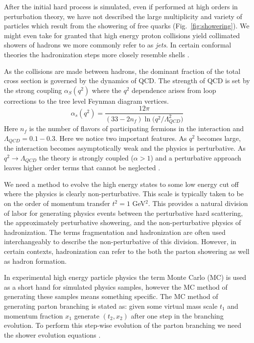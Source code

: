 After the initial hard process is simulated, even if performed at high orders in perturbation theory, we have not
described the large multiplicity and variety of particles which result from the showering of free quarks (Fig.~\ref{fig:showering}). 
We might even take for granted that high energy proton collisions yield collimated showers of hadrons
 we more commonly refer to as \textit{jets}. In certain conformal theories the hadronization steps more 
closely resemble shells \cite{juan}.

As the collisions are made between hadrons, the dominant fraction
of the total cross section is governed by the dynamics of QCD. The strength of QCD is set by the strong coupling $\alpha_S(q^2)$ where the $q^2$ dependence arises from loop corrections to the tree level Feynman diagram vertices. \cite{tully}
\begin{equation} \label{eq:running_qcd}
\alpha_s(q^2) = \frac{12\pi}{(33-2n_f)\ln{(q^2 /\Lambda_{QCD}^2})}
\end{equation}
Here $n_f$ is the number of flavors of participating fermions in the interaction and $\Lambda_{QCD}=0.1-0.3$. Here we notice two important features. As $q^2$ becomes large, the interaction becomes asymptotically weak and the physics is perturbative. As $q^2\rightarrow \Lambda_{QCD}$ the theory is
strongly coupled ($\alpha > 1$) and a perturbative approach leaves higher order terms that cannot be neglected 
\cite{qcdcollider}.

We need a method to evolve the high energy states to some low energy cut off where the physics is clearly non-perturbative. 
This scale is typically taken to be on the order of momentum transfer $t^2 = 1$ GeV$^2$.
This provides a natural division of labor for generating physics events between the perturbative hard scattering, the approximately perturbative showering, and the non-perturbative physics of hadronization. The terms fragmentation and hadronization are often used interchangeably to describe the non-perturbative of this division. However, in certain contexts, hadronization can refer to the both the parton showering as well as hadron formation. 

In experimental high energy particle physics the term Monte Carlo (MC) is used as a short hand for simulated 
physics samples, however the MC method of generating
these samples means something specific. The MC method of generating parton branching is stated as: given some 
virtual mass scale $t_1$ and momentum fraction $x_1$ generate
 $(t_2, x_2)$ after one step in the branching evolution. To perform this step-wise evolution of the parton 
branching we need the shower evolution equations \cite{pythia6}.

